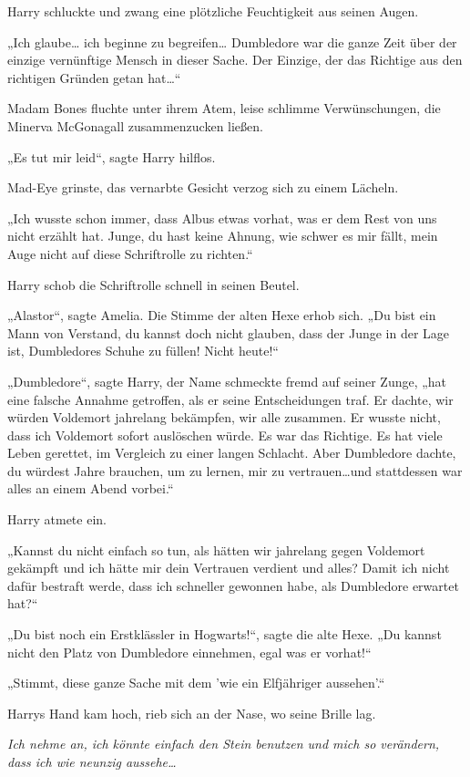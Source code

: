 {Harry schluckte und zwang eine plötzliche Feuchtigkeit aus seinen Augen.

„Ich glaube… ich beginne zu begreifen… Dumbledore war die ganze Zeit über der einzige vernünftige Mensch in dieser Sache. Der Einzige, der das Richtige aus den richtigen Gründen getan hat…“

Madam Bones fluchte unter ihrem Atem, leise schlimme Verwünschungen, die Minerva McGonagall zusammenzucken ließen.

„Es tut mir leid“, sagte Harry hilflos.

Mad-Eye grinste, das vernarbte Gesicht verzog sich zu einem Lächeln.

„Ich wusste schon immer, dass Albus etwas vorhat, was er dem Rest von uns nicht erzählt hat. Junge, du hast keine Ahnung, wie schwer es mir fällt, mein Auge nicht auf diese Schriftrolle zu richten.“

Harry schob die Schriftrolle schnell in seinen Beutel.

„Alastor“, sagte Amelia. Die Stimme der alten Hexe erhob sich. „Du bist ein Mann von Verstand, du kannst doch nicht glauben, dass der Junge in der Lage ist, Dumbledores Schuhe zu füllen! Nicht heute!“

„Dumbledore“, sagte Harry, der Name schmeckte fremd auf seiner Zunge, „hat eine falsche Annahme getroffen, als er seine Entscheidungen traf. Er dachte, wir würden Voldemort jahrelang bekämpfen, wir alle zusammen. Er wusste nicht, dass ich Voldemort sofort auslöschen würde. Es war das Richtige. Es hat viele Leben gerettet, im Vergleich zu einer langen Schlacht. Aber Dumbledore dachte, du würdest Jahre brauchen, um zu lernen, mir zu vertrauen…und stattdessen war alles an einem Abend vorbei.“

Harry atmete ein.

„Kannst du nicht einfach so tun, als hätten wir jahrelang gegen Voldemort gekämpft und ich hätte mir dein Vertrauen verdient und alles? Damit ich nicht dafür bestraft werde, dass ich schneller gewonnen habe, als Dumbledore erwartet hat?“

„Du bist noch ein Erstklässler in Hogwarts!“, sagte die alte Hexe. „Du kannst nicht den Platz von Dumbledore einnehmen, egal was er vorhat!“

„Stimmt, diese ganze Sache mit dem 'wie ein Elfjähriger aussehen'.“

Harrys Hand kam hoch, rieb sich an der Nase, wo seine Brille lag.

\emph{Ich nehme an, ich könnte einfach den Stein benutzen und mich so verändern, dass ich wie neunzig aussehe…}

}
